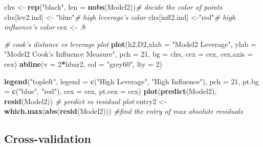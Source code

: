 \documentclass[]{article}
\newenvironment{Shaded}{\begin{snugshade}}{\end{snugshade}}
\newcommand{\KeywordTok}[1]{\textcolor[rgb]{0.13,0.29,0.53}{\textbf{#1}}}
\newcommand{\DataTypeTok}[1]{\textcolor[rgb]{0.13,0.29,0.53}{#1}}
\newcommand{\DecValTok}[1]{\textcolor[rgb]{0.00,0.00,0.81}{#1}}
\newcommand{\StringTok}[1]{\textcolor[rgb]{0.31,0.60,0.02}{#1}}
\newcommand{\CommentTok}[1]{\textcolor[rgb]{0.56,0.35,0.01}{\textit{#1}}}
\newcommand{\OperatorTok}[1]{\textcolor[rgb]{0.81,0.36,0.00}{\textbf{#1}}}
\newcommand{\NormalTok}[1]{#1}
\begin{document}
\begin{Shaded}
\begin{Highlighting}[]
\NormalTok{clrs <-}\StringTok{ }\KeywordTok{rep}\NormalTok{(}\StringTok{"black"}\NormalTok{, }\DataTypeTok{len =} \KeywordTok{nobs}\NormalTok{(Model2))}\CommentTok{# decide the color of points}
\NormalTok{clrs[lev2.ind] <-}\StringTok{ "blue"}\CommentTok{# high leverage's color}
\NormalTok{clrs[infl2.ind] <-}\StringTok{"red"}\CommentTok{# high influence's color}
\NormalTok{cex <-}\StringTok{ }\NormalTok{.}\DecValTok{8}

\CommentTok{# cook's distance vs leverage plot}
\KeywordTok{plot}\NormalTok{(h2,D2,}\DataTypeTok{xlab =} \StringTok{"Model2 Leverage"}\NormalTok{,}
     \DataTypeTok{ylab =} \StringTok{"Model2 Cook's Influence Measure"}\NormalTok{,}
     \DataTypeTok{pch =} \DecValTok{21}\NormalTok{, }\DataTypeTok{bg =}\NormalTok{ clrs, }\DataTypeTok{cex =}\NormalTok{ cex, }\DataTypeTok{cex.axis =}\NormalTok{ cex)}
\KeywordTok{abline}\NormalTok{(}\DataTypeTok{v =} \DecValTok{2}\OperatorTok{*}\NormalTok{hbar2, }\DataTypeTok{col =} \StringTok{"grey60"}\NormalTok{, }\DataTypeTok{lty =} \DecValTok{2}\NormalTok{)}

\KeywordTok{legend}\NormalTok{(}\StringTok{"topleft"}\NormalTok{, }\DataTypeTok{legend =} \KeywordTok{c}\NormalTok{(}\StringTok{"High Leverage"}\NormalTok{, }\StringTok{"High Influence"}\NormalTok{),}
       \DataTypeTok{pch =} \DecValTok{21}\NormalTok{, }\DataTypeTok{pt.bg =} \KeywordTok{c}\NormalTok{(}\StringTok{"blue"}\NormalTok{, }\StringTok{"red"}\NormalTok{),}
       \DataTypeTok{cex =}\NormalTok{ cex, }\DataTypeTok{pt.cex =}\NormalTok{ cex)}
\KeywordTok{plot}\NormalTok{(}\KeywordTok{predict}\NormalTok{(Model2), }\KeywordTok{resid}\NormalTok{(Model2)) }\CommentTok{# predict vs residual plot}
\NormalTok{entry2 <-}\StringTok{ }\KeywordTok{which.max}\NormalTok{(}\KeywordTok{abs}\NormalTok{(}\KeywordTok{resid}\NormalTok{(Model2))) }\CommentTok{#find the entry of max absolute residuals}
\end{Highlighting}
\end{Shaded}

\subsection{Cross-validation}\label{cross-validation-1}
\end{document}
